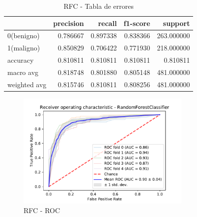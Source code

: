 \documentclass[12pt,twoside]{report}
\begin{document}
\begin{table}[htp]
\begin{center}
\begin{tabular}{lrrrr}
\toprule
{} &  precision &    recall &  f1-score &     support \\
\midrule
0(benigno)&   0.786667 &  0.897338 &  0.838366 &  263.000000 \\
1(maligno)&   0.850829 &  0.706422 &  0.771930 &  218.000000 \\
accuracy     &   0.810811 &  0.810811 &  0.810811 &    0.810811 \\
macro avg    &   0.818748 &  0.801880 &  0.805148 &  481.000000 \\
weighted avg &   0.815746 &  0.810811 &  0.808256 &  481.000000 \\
\bottomrule
\end{tabular}
\end{center}
\caption{RFC - Tabla de errores}
\label{rfc:precision}
\end{table}

\begin{figure}[htp]
\begin{center}
\includegraphics[width=8.5cm]{./code/figures_python/roc/rfc.pdf}%
\end{center}
 \caption{RFC - ROC}
 \label{rfc:roc}
 \end{figure}
 
\end{document}
